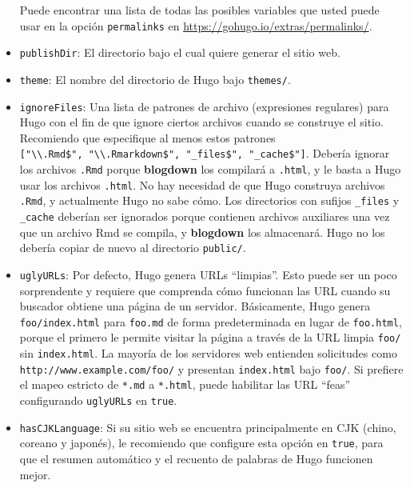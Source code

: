 \documentclass[12pt,]{krantz}
\theoremstyle{definition}
\theoremstyle{definition}
\theoremstyle{definition}
\theoremstyle{remark}
\begin{document}
\begin{itemize}
  Puede encontrar una lista de todas las posibles variables que usted
  puede usar en la opción \texttt{permalinks} en
  \url{https://gohugo.io/extras/permalinks/}.
\item
  \texttt{publishDir}: El directorio bajo el cual quiere generar el
  sitio web.
\item
  \texttt{theme}: El nombre del directorio de Hugo bajo
  \texttt{themes/}.
\item
  \texttt{ignoreFiles}: Una lista de patrones de archivo (expresiones
  regulares) para Hugo con el fin de que ignore
  ciertos archivos cuando se construye el sitio. Recomiendo que
  especifique al menos estos patrones
  \texttt{{[}"\textbackslash{}\textbackslash{}.Rmd\$",\ "\textbackslash{}\textbackslash{}.Rmarkdown\$",\ "\_files\$",\ "\_cache\$"{]}}.
  Debería ignorar los archivos \texttt{.Rmd} porque \textbf{blogdown}
  los compilará a \texttt{.html}, y le basta a Hugo usar los archivos
  \texttt{.html}. No hay necesidad de que Hugo construya archivos
  \texttt{.Rmd}, y actualmente Hugo no sabe cómo. Los directorios con
  sufijos \texttt{\_files} y \texttt{\_cache} deberían ser ignorados
  porque contienen archivos auxiliares una vez que un archivo Rmd se
  compila, y \textbf{blogdown} los almacenará. Hugo no los debería
  copiar de nuevo al directorio \texttt{public/}.
\item
  \texttt{uglyURLs}: Por defecto, Hugo genera URLs
  ``limpias''. Esto puede ser un poco sorprendente y
  requiere que comprenda cómo funcionan las URL cuando su buscador
  obtiene una página de un servidor. Básicamente, Hugo genera
  \texttt{foo/index.html} para \texttt{foo.md} de forma predeterminada
  en lugar de \texttt{foo.html}, porque el primero le permite visitar la
  página a través de la URL limpia \texttt{foo/} sin
  \texttt{index.html}. La mayoría de los servidores web entienden
  solicitudes como \texttt{http://www.example.com/foo/} y presentan
  \texttt{index.html} bajo \texttt{foo/}. Si prefiere el mapeo estricto
  de \texttt{*.md} a \texttt{*.html}, puede habilitar las URL ``feas''
  configurando \texttt{uglyURLs} en \texttt{true}.
\item
  \texttt{hasCJKLanguage}: Si su sitio web se encuentra principalmente
  en CJK (chino, coreano y japonés), le recomiendo
  que configure esta opción en \texttt{true}, para que el resumen
  automático y el recuento de palabras de Hugo funcionen mejor.
\end{itemize}
\end{document}

